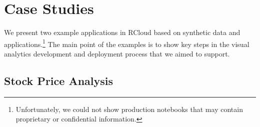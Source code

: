 \section{Case Studies}

We present two example applications in RCloud based on synthetic data
and applications.\footnote{Unfortunately, we could not show production
notebooks that may contain proprietary or confidential information.}
The main point of the examples is to show key steps in the visual
analytics development and deployment process that we aimed to support.

\subsection{Stock Price Analysis\label{sec:stockvis}}

